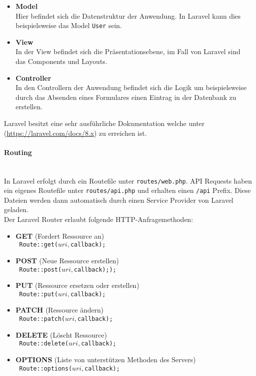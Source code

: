 \begin{itemize}
  \item \textbf{Model} \\
  Hier befindet sich die Datenstruktur der Anwendung. In Laravel kann dies
  beispielsweise das Model \verb|User| sein.
  \item \textbf{View} \\
  In der View befindet sich die Präsentationsebene, im Fall von Laravel sind das
  Components und Layouts.
  \item \textbf{Controller} \\
  In den Controllern der Anwendung befindet sich die Logik um beispielsweise
  durch das Absenden eines Formulares einen Eintrag in der Datenbank zu erstellen. 
\end{itemize}

Laravel besitzt eine sehr ausführliche Dokumentation welche unter
(\url{https://laravel.com/docs/8.x}) zu erreichen ist.

\paragraph{Routing}\mbox{}\\
In Laravel erfolgt durch ein Routefile unter \verb|routes/web.php|. API Requests
haben ein eigenes Routefile unter \verb|routes/api.php| und erhalten einen
\verb|/api| Prefix. Diese Dateien werden dann automatisch durch einen Service
Provider von Laravel geladen.\\

Der Laravel Router erlaubt folgende HTTP-Anfragemethoden:
\begin{itemize}
  \item \textbf{GET} (Fordert Ressource an)\\
  \texttt{  Route::get($uri, $callback);}
  \item \textbf{POST} (Neue Ressource erstellen)\\
  \texttt{  Route::post($uri, $callback););}
  \item \textbf{PUT} (Ressource ersetzen oder erstellen)\\
  \texttt{  Route::put($uri, $callback);}
  \item \textbf{PATCH} (Ressource ändern)\\
  \texttt{  Route::patch($uri, $callback);}
  \item \textbf{DELETE} (Löscht Ressource)\\
  \texttt{  Route::delete($uri, $callback);}
  \item \textbf{OPTIONS} (Liste von unterstützen Methoden des Servers)\\
  \texttt{  Route::options($uri, $callback);}
\end{itemize}

